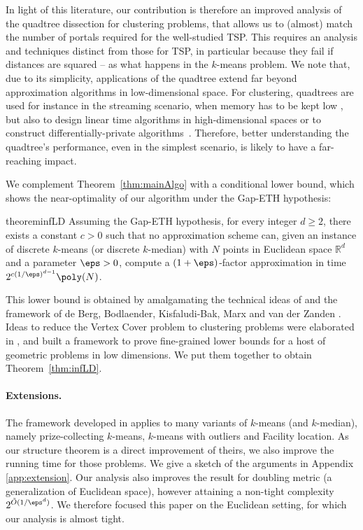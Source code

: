 In light of this literature, our contribution is therefore an improved analysis of the quadtree dissection for clustering problems, that allows us to (almost) match the number of portals required for the well-studied TSP. This requires an analysis and techniques distinct from those for TSP, in particular because they fail if distances are squared -- as what happens in the $k$-means problem.
We note that, due to its simplicity, applications of the quadtree extend far beyond approximation algorithms in low-dimensional space. 
For clustering, quadtrees are used for instance in the streaming scenario, when memory has to be kept low \cite{BravermanFLSY17}, but also to design linear time algorithms in high-dimensional spaces \cite{rejectionSampling} or to construct differentially-private algorithms~\cite{kdd}. 
Therefore, better understanding the quadtree's performance, even in the simplest scenario, is likely to have a far-reaching impact.




We complement Theorem~\ref{thm:mainAlgo} with a conditional lower bound, which shows the near-optimality of our algorithm under the Gap-ETH hypothesis:

\begin{restatable}{theorem}{infLD}
    \label{thm:infLD}
Assuming the Gap-ETH hypothesis, for every integer $d \ge 2$, there exists a constant $c > 0$ such that no approximation scheme can, given an instance of discrete $k$-means (or discrete $k$-median) with $N$ points in Euclidean space $\mathbb{R}^d$ and a parameter $\eps > 0$, compute a $(1+\eps)$-factor approximation in time $2^{c(1/\eps)^{d-1}} \poly(N)$.
\end{restatable}


This lower bound is obtained by amalgamating the technical ideas of \cite{LeeSW17,CohenaddadSODA18,Cohen-AddadS19} and the framework of de Berg, Bodlaender, Kisfaludi-Bak, Marx and van der Zanden \cite{BergBKMZ20}. Ideas to reduce the Vertex Cover problem to clustering problems were elaborated in \cite{LeeSW17,CohenaddadSODA18,Cohen-AddadS19}, and \cite{BergBKMZ20} built a framework  to prove fine-grained lower bounds for a host of geometric problems in low dimensions. We put them together to obtain Theorem~\ref{thm:infLD}.

\paragraph*{Extensions.}
The framework developed in \cite{jacm} applies to many variants of $k$-means (and $k$-median), namely prize-collecting $k$-means, $k$-means with outliers and Facility location. As our structure theorem is a direct improvement of theirs, we also improve the running time for those problems. We give a sketch of the arguments in Appendix \ref{app:extension}. 
Our analysis also improves the result for doubling metric (a generalization of Euclidean space), however attaining a non-tight complexity $2^{\tilde O(1/\eps^d)}$. 
We therefore focused this paper on the Euclidean setting, for which our analysis is almost tight.

